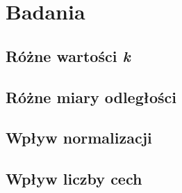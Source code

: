 \section{Badania}
	\blindtext

\subsection{Różne wartości \textit{k}}
	\blindtext

\subsection{Różne miary odległości}
	\blindtext

\subsection{Wpływ normalizacji}
	\blindtext

\subsection{Wpływ liczby cech}
	\blindtext